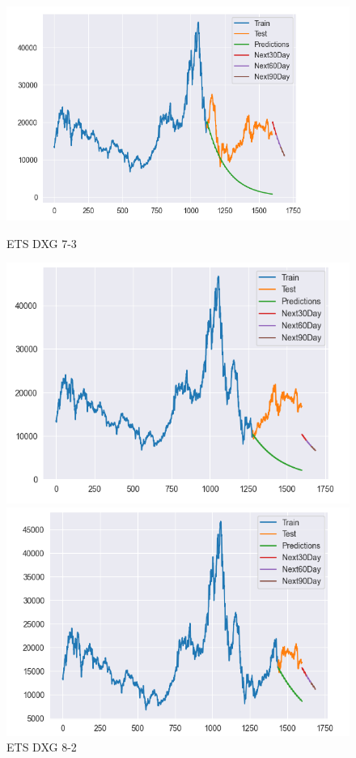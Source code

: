 \documentclass[conference]{IEEEtran}
\begin{document}
\begin{figure}[htbp]
    \begin{minipage}{0.23\textwidth}
    \centering
    \includegraphics[width=1\textwidth]{experiment/ets/TEAM4_ETS_DXG_7_3.png}
    \caption{ETS DXG 7-3}
    \label{fig:nvl_boxplot}
    \end{minipage}
    \hfill
    \begin{minipage}{0.23\textwidth}
    \centering
    \includegraphics[width=1\textwidth]{experiment/ets/TEAM4_ETS_DXG_8_2.png}
    \caption{ETS DXG 8-2}
    \label{fig:nvl_histogram}
    \end{minipage}
    \begin{minipage}{0.23\textwidth}
    \centering
    \includegraphics[width=1\textwidth]{experiment/ets/TEAM4_ETS_DXG_9_1.png}

\end{minipage}
\end{figure}
\end{document}
